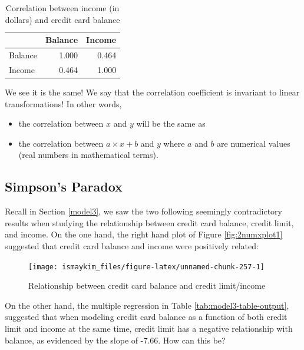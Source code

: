 \documentclass[12pt,]{krantz}
\providecommand{\tightlist}{%
  \setlength{\itemsep}{0pt}\setlength{\parskip}{0pt}}
\theoremstyle{definition}
\theoremstyle{definition}
\theoremstyle{definition}
\theoremstyle{remark}
\begin{document}
\begin{table}[H]

\caption{\label{tab:cor-credit-2}Correlation between income (in dollars) and credit card balance}
\centering
\fontsize{10}{12}\selectfont
\begin{tabular}[t]{lrr}
\toprule
  & Balance & Income\\
\midrule
Balance & 1.000 & 0.464\\
Income & 0.464 & 1.000\\
\bottomrule
\end{tabular}
\end{table}

We see it is the same! We say that the correlation coefficient is
invariant to linear transformations! In other words,

\begin{itemize}
\tightlist
\item
  the correlation between \(x\) and \(y\) will be the same as
\item
  the correlation between \(a\times x + b\) and \(y\) where \(a\) and
  \(b\) are numerical values (real numbers in mathematical terms).
\end{itemize}

\subsection{Simpson's Paradox}\label{simpsonsparadox}

Recall in Section \ref{model3}, we saw the two following seemingly
contradictory results when studying the relationship between credit card
balance, credit limit, and income. On the one hand, the right hand plot
of Figure \ref{fig:2numxplot1} suggested that credit card balance and
income were positively related:

\begin{figure}

{\centering \texttt{[image: ismaykim\_files/figure-latex/unnamed-chunk-257-1]} 

}

\caption{Relationship between credit card balance and credit limit/income}\label{fig:unnamed-chunk-257}
\end{figure}

On the other hand, the multiple regression in Table
\ref{tab:model3-table-output}, suggested that when modeling credit card
balance as a function of both credit limit and income at the same time,
credit limit has a negative relationship with balance, as evidenced by
the slope of -7.66. How can this be?
\end{document}

